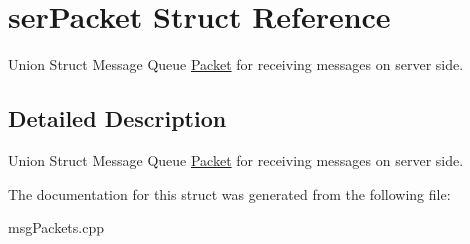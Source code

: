 \hypertarget{structserPacket}{\section{ser\-Packet Struct Reference}
\label{structserPacket}
}


Union Struct Message Queue \hyperlink{structPacket}{Packet} for receiving messages on server side.  




\subsection{Detailed Description}
Union Struct Message Queue \hyperlink{structPacket}{Packet} for receiving messages on server side. 

The documentation for this struct was generated from the following file\-:\begin{DoxyCompactItemize}
\item 
msg\-Packets.\-cpp\end{DoxyCompactItemize}
